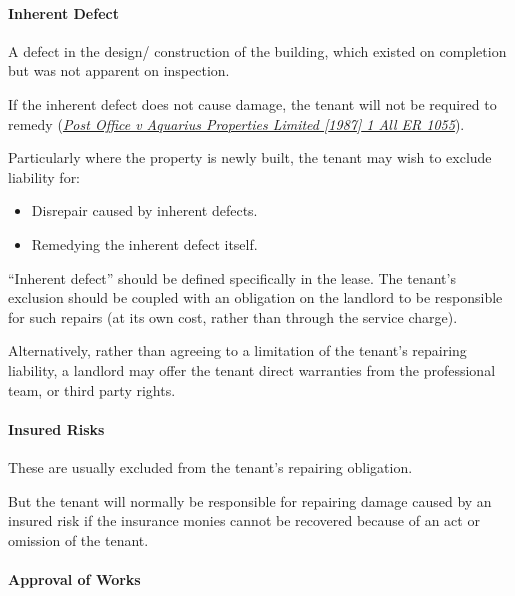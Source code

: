 \documentclass[
]{article}
\providecommand{\tightlist}{%
  \setlength{\itemsep}{0pt}\setlength{\parskip}{0pt}}
\begin{document}
\hypertarget{inherent-defect}{%
\paragraph{Inherent Defect}\label{inherent-defect}}

A defect in the design/ construction of the building, which existed on
completion but was not apparent on inspection.

If the inherent defect does not cause damage, the tenant will not be
required to remedy
(\emph{\href{https://uk.practicallaw.thomsonreuters.com/D-009-7107?originationContext=document\&transitionType=PLDocumentLink\&contextData=(sc.Default)\&ppcid=966adc813d44458ba2271293efe92ed6}{Post
Office v Aquarius Properties Limited {[}1987{]} 1 All ER 1055}}).

Particularly where the property is newly built, the tenant may wish to
exclude liability for:

\begin{itemize}
\tightlist
\item
  Disrepair caused by inherent defects.
\item
  Remedying the inherent defect itself.
\end{itemize}

``Inherent defect'' should be defined specifically in the lease. The
tenant's exclusion should be coupled with an obligation on the landlord
to be responsible for such repairs (at its own cost, rather than through
the service charge).

Alternatively, rather than agreeing to a limitation of the tenant's
repairing liability, a landlord may offer the tenant direct warranties
from the professional team, or third party rights.

\hypertarget{insured-risks}{%
\paragraph{Insured Risks}\label{insured-risks}}

These are usually excluded from the tenant's repairing obligation.

But the tenant will normally be responsible for repairing damage caused
by an insured risk if the insurance monies cannot be recovered because
of an act or omission of the tenant.

\hypertarget{approval-of-works}{%
\paragraph{Approval of Works}\label{approval-of-works}}
\end{document}

